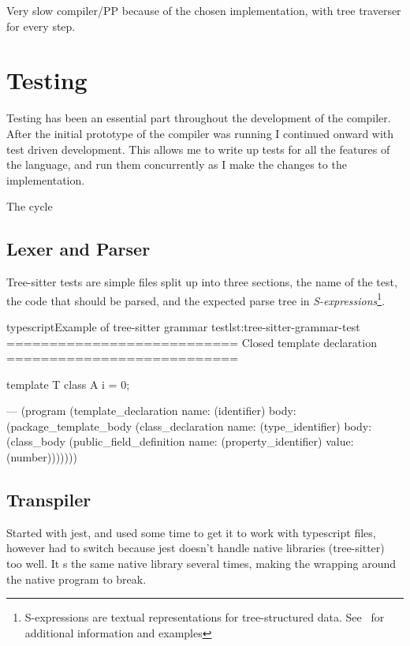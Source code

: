 Very slow compiler/PP because of the chosen implementation, with tree traverser for every step.


\section{Testing}\label{sec:testing}

Testing has been an essential part throughout the development of the compiler.
After the initial prototype of the compiler was running I continued onward with test driven development.
This allows me to write up tests for all the features of the language, and run them concurrently as I make the changes to the implementation.

The cycle

\subsection{Lexer and Parser}\label{subsec:testing-lexer-and-parser}

Tree-sitter tests are simple  files split up into three sections, the name of the test, the code that should be parsed, and the expected parse tree in \textit{S-expressions}\footnote{S-expressions are textual representations for tree-structured data. See~\cite{sexprs} for additional information and examples}.

\begin{code}{typescript}{Example of tree-sitter grammar test}{lst:tree-sitter-grammar-test}
    ===========================
    Closed template declaration
    ===========================

    template T {
        class A {
            i = 0;
        }
    }

    ---
    (program
        (template_declaration
            name: (identifier)
            body: (package_template_body
                    (class_declaration
                        name: (type_identifier)
                        body: (class_body
                            (public_field_definition
                                name: (property_identifier)
                                value: (number)))))))

\end{code}

\subsection{Transpiler}\label{subsec:testing-transpiler}

Started with jest, and used some time to get it to work with typescript files, however had to switch because jest doesn't handle native libraries (tree-sitter) too well.
It s the same native library several times, making the wrapping around the native program to break.